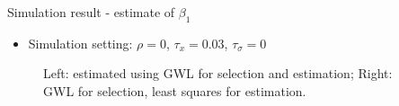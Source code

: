 \documentclass{beamer}
\begin{document}
\begin{frame}{Simulation result - estimate of $\beta_1$} 

\begin{itemize}
	\item Simulation setting: $\rho=0$, $\tau_x=0.03$, $\tau_\sigma=0$
\end{itemize}
\vspace{-10mm}
\begin{figure}
\begin{center}
	\caption{Left: estimated using GWL for selection and estimation; Right: GWL for selection, least squares for estimation.}
\end{center}
\end{figure}
\end{frame} 
\end{document}
